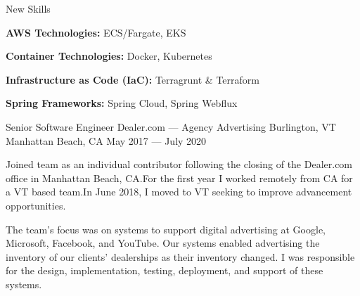 \vspace{-2.00mm}
\begin{cventries}
\cventry
    {New Skills} %
    {} %
    {} %
    {} %
    {%
      \begin{cvitems} %
        \item {\textbf{AWS Technologies:} ECS/Fargate, EKS}
        \item {\textbf{Container Technologies:} Docker, Kubernetes}
        \item {\textbf{Infrastructure as Code (IaC):} Terragrunt \& Terraform}
        \item {\textbf{Spring Frameworks:} Spring Cloud, Spring Webflux}
      \end{cvitems}
    }


  \cventry
    {Senior Software Engineer} %
    {Dealer.com --- Agency Advertising} %
    {Burlington, VT \linebreak Manhattan Beach, CA} %
    {May 2017 --- July 2020} %
    {}
\end{cventries}

\vspace{-4.00mm}
\begin{cvparagraph}
Joined team as an individual contributor following the closing of the
Dealer.com office in Manhattan Beach, CA.\@ For the first year I worked
remotely from CA for a VT based team.\@ In June 2018, I moved to VT
seeking to improve advancement opportunities.
\end{cvparagraph}

\vspace{-1.00mm}

\begin{cvparagraph}
The team's focus was on systems to support digital advertising at Google, Microsoft, Facebook, and YouTube.\@
Our systems enabled advertising the inventory of our clients' dealerships as their inventory changed.\@
I was responsible for the design, implementation, testing, deployment, and support of these systems.
\end{cvparagraph}

